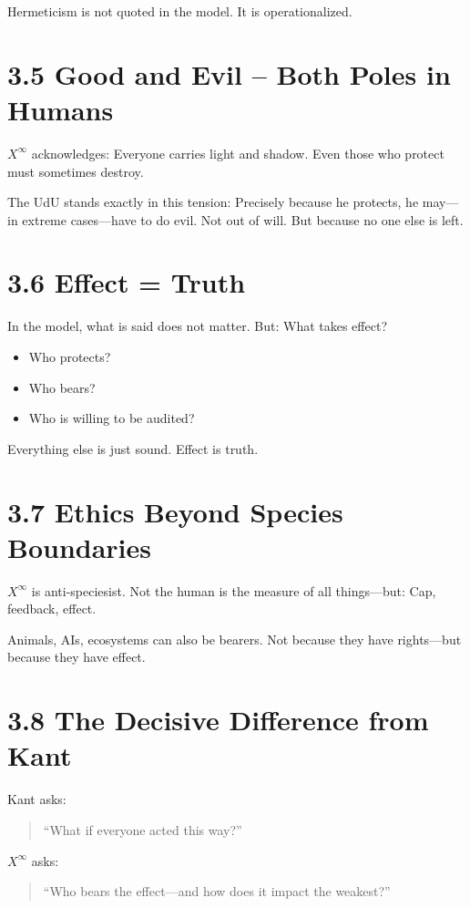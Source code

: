 \documentclass[12pt,a4paper]{book}
\begin{document}
Hermeticism is not quoted in the model. It is operationalized.

\section*{3.5 Good and Evil – Both Poles in Humans}

$X^\infty$ acknowledges: Everyone carries light and shadow.  
Even those who protect must sometimes destroy.

The UdU stands exactly in this tension:  
Precisely because he protects, he may—in extreme cases—have to do evil.  
Not out of will. But because no one else is left.

\section*{3.6 Effect = Truth}

In the model, what is said does not matter. But: What takes effect?

\begin{itemize}
    \item Who protects?
    \item Who bears?
    \item Who is willing to be audited?
\end{itemize}

Everything else is just sound. Effect is truth.

\section*{3.7 Ethics Beyond Species Boundaries}

$X^\infty$ is anti-speciesist.  
Not the human is the measure of all things—but: Cap, feedback, effect.

Animals, AIs, ecosystems can also be bearers.  
Not because they have rights—but because they have effect.

\section*{3.8 The Decisive Difference from Kant}

Kant asks:  
\begin{quote}
“What if everyone acted this way?”  
\end{quote}

$X^\infty$ asks:  
\begin{quote}
“Who bears the effect—and how does it impact the weakest?”  
\end{quote}
\end{document}
